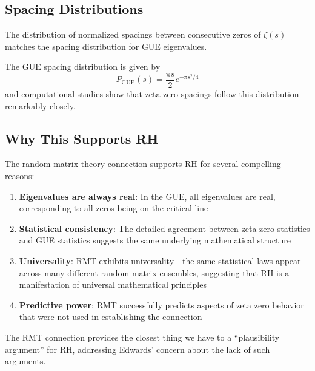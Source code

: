 \subsection{Spacing Distributions}
\label{subsec:spacing_distributions}

\begin{theorem}
The distribution of normalized spacings between consecutive zeros of $\zeta(s)$ matches the spacing distribution for GUE eigenvalues.
\end{theorem}

The GUE spacing distribution is given by
\begin{equation}
P_{\text{GUE}}(s) = \frac{\pi s}{2} e^{-\pi s^2/4}
\end{equation}
and computational studies show that zeta zero spacings follow this distribution remarkably closely.

\subsection{Why This Supports RH}
\label{subsec:rmt_support_rh}

The random matrix theory connection supports RH for several compelling reasons:

\begin{enumerate}
\item \textbf{Eigenvalues are always real}: In the GUE, all eigenvalues are real, corresponding to all zeros being on the critical line

\item \textbf{Statistical consistency}: The detailed agreement between zeta zero statistics and GUE statistics suggests the same underlying mathematical structure

\item \textbf{Universality}: RMT exhibits universality - the same statistical laws appear across many different random matrix ensembles, suggesting that RH is a manifestation of universal mathematical principles

\item \textbf{Predictive power}: RMT successfully predicts aspects of zeta zero behavior that were not used in establishing the connection
\end{enumerate}

\begin{remark}
The RMT connection provides the closest thing we have to a ``plausibility argument'' for RH, addressing Edwards' concern about the lack of such arguments.
\end{remark}

